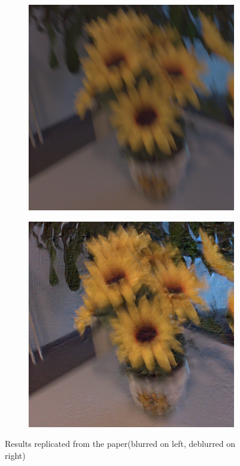 \documentclass[10pt,twocolumn,letterpaper]{article}
\begin{document}
\vspace{-1cm}
\begin{figure}[h]
  \centering
  \begin{subfigure}{.5\columnwidth}
    \centering
    \includegraphics[width=\linewidth]{images/flower.png}
  \end{subfigure}%
  \hfill
  \begin{subfigure}{.5\columnwidth}
    \centering
    \includegraphics[width=\linewidth]{images/flower_dg.png}
  \end{subfigure}%
  \hfill
  \caption{Results replicated from the paper(blurred on left, deblurred on right)}
  \label{fig:ExampleBlurField}
\end{figure}
\end{document}
